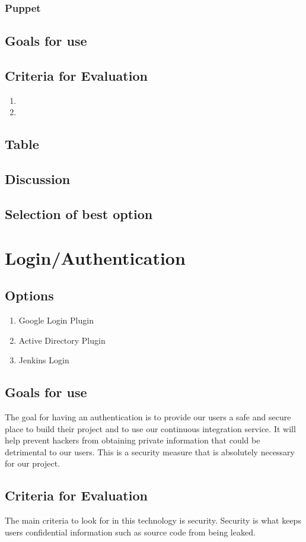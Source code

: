 \documentclass[10pt,letterpaper,onecolumn,journal]{IEEEtran}
\begin{document}
\subsubsection{Puppet}
\subsection{Goals for use}
\subsection{Criteria for Evaluation}
\begin{enumerate}
  \item
  \item
\end{enumerate}
\subsection{Table}
\subsection{Discussion}
\subsection{Selection of best option}

\section{Login/Authentication}
\subsection{Options}
\begin{enumerate}
  \item Google Login Plugin
  \item Active Directory Plugin
  \item Jenkins Login
\end{enumerate}
\subsection{Goals for use}
The goal for having an authentication is to provide our users a safe and secure place to build their project and to use our continuous integration service.
It will help prevent hackers from obtaining private information that could be detrimental to our users.
This is a security measure that is absolutely necessary for our project.
\subsection{Criteria for Evaluation}
The main criteria to look for in this technology is security.
Security is what keeps users confidential information such as source code from being leaked.
\end{document}
